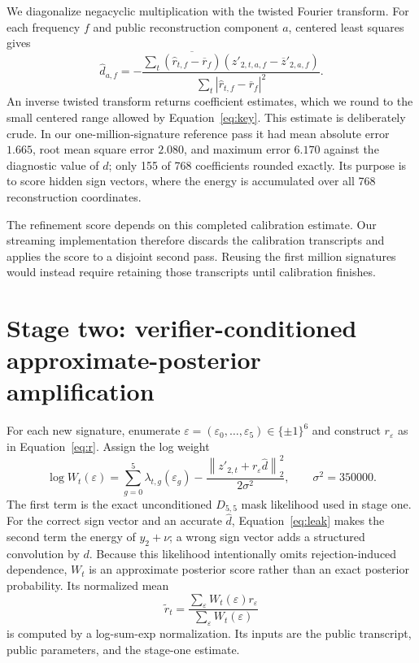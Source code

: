 \documentclass[11pt]{article}
\begin{document}
We diagonalize negacyclic multiplication with the twisted Fourier transform.  For each
frequency $f$ and public reconstruction component $a$, centered least squares gives
\begin{equation}
 \widehat d_{a,f}=-
 \frac{\sum_t \overline{(\widehat r_{t,f}-\overline r_f)}
                    (z'_{2,t,a,f}-\overline z'_{2,a,f})}
      {\sum_t|\widehat r_{t,f}-\overline r_f|^2}.                   \label{eq:dreg}
\end{equation}
An inverse twisted transform returns coefficient estimates, which we round to the small
centered range allowed by Equation~\eqref{eq:key}.  This estimate is deliberately crude.  In
our one-million-signature reference pass it had mean absolute error $1.665$, root mean square
error $2.080$, and maximum error $6.170$ against the diagnostic value of $d$; only 155 of 768
coefficients rounded exactly.  Its purpose is to score hidden sign vectors, where the energy
is accumulated over all 768 reconstruction coordinates.

The refinement score depends on this completed calibration estimate.  Our streaming
implementation therefore discards the calibration transcripts and applies the score to a
disjoint second pass.  Reusing the first million signatures would instead require retaining
those transcripts until calibration finishes.

\section{Stage two: verifier-conditioned approximate-posterior amplification}
\label{sec:amplification}

For each new signature, enumerate
$\varepsilon=(\varepsilon_0,\ldots,\varepsilon_5)\in\{\pm1\}^6$ and construct
$r_\varepsilon$ as in Equation~\eqref{eq:r}.  Assign the log weight
\begin{equation}
 \log W_t(\varepsilon)=
   \sum_{g=0}^{5}\lambda_{t,g}(\varepsilon_g)
   -\frac{\left\lVert z'_{2,t}+r_\varepsilon\widehat d\right\rVert_2^2}
          {2\sigma^2},
 \qquad \sigma^2=350000.                                           \label{eq:weight}
\end{equation}
The first term is the exact unconditioned $D_{5,5}$ mask likelihood used in stage one.  For the correct
sign vector and an accurate $\widehat d$, Equation~\eqref{eq:leak} makes the second term the
energy of $y_2+\nu$; a wrong sign vector adds a structured convolution by $d$.  Because this
likelihood intentionally omits rejection-induced dependence, $W_t$ is an approximate posterior
score rather than an exact posterior probability.  Its normalized mean
\begin{equation}
 \widetilde r_t=
 \frac{\sum_{\varepsilon}W_t(\varepsilon)r_\varepsilon}
      {\sum_{\varepsilon}W_t(\varepsilon)}                         \label{eq:rpost}
\end{equation}
is computed by a log-sum-exp normalization.  Its inputs are the public transcript, public
parameters, and the stage-one estimate.
\end{document}
